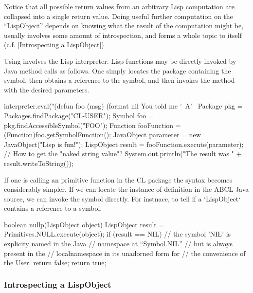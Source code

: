 \documentclass[10pt]{book}
\begin{document}
Notice that all possible return values from an arbitrary Lisp
computation are collapsed into a single return value.  Doing useful
further computation on the ``LispObject'' depends on knowing what the
result of the computation might be, usually involves some amount
of  introspection, and forms a whole topic to itself
(c.f. [Introspecting a LispObject])

Using  involves the Lisp interpreter.  Lisp functions may
be directly invoked by Java method calls as follows.  One simply
locates the package containing the symbol, then obtains a reference to
the symbol, and then invokes the  method with the
desired parameters.

\begin{listing-java}
    interpreter.eval("(defun foo (msg) (format nil \"You told me '~A'~%
    Package pkg = Packages.findPackage("CL-USER");
    Symbol foo = pkg.findAccessibleSymbol("FOO"); 
    Function fooFunction = (Function)foo.getSymbolFunction();
    JavaObject parameter = new JavaObject("Lisp is fun!");
    LispObject result = fooFunction.execute(parameter);
    // How to get the "naked string value"?
    System.out.println("The result was " + result.writeToString()); 
\end{listing-java}

If one is calling an primitive function in the CL package the syntax
becomes considerably simpler.  If we can locate the instance of
definition in the ABCL Java source, we can invoke the symbol directly.
For instnace, to tell if a `LispObject` contains a reference to a symbol.

\begin{listing-java}
    boolean nullp(LispObject object) {
      LispObject result = Primitives.NULL.execute(object);
      if (result == NIL) { // the symbol 'NIL' is explicity named in the Java
                           // namespace at ``Symbol.NIL''
                           // but is always present in the
                           // localnamespace in its unadorned form for
                           // the convenience of the User.
        return false;
      }
      return true;
   }
\end{listing-java}

\subsubsection{Introspecting a LispObject}
\label{topic:Introspecting a LispObject}
\end{document}
